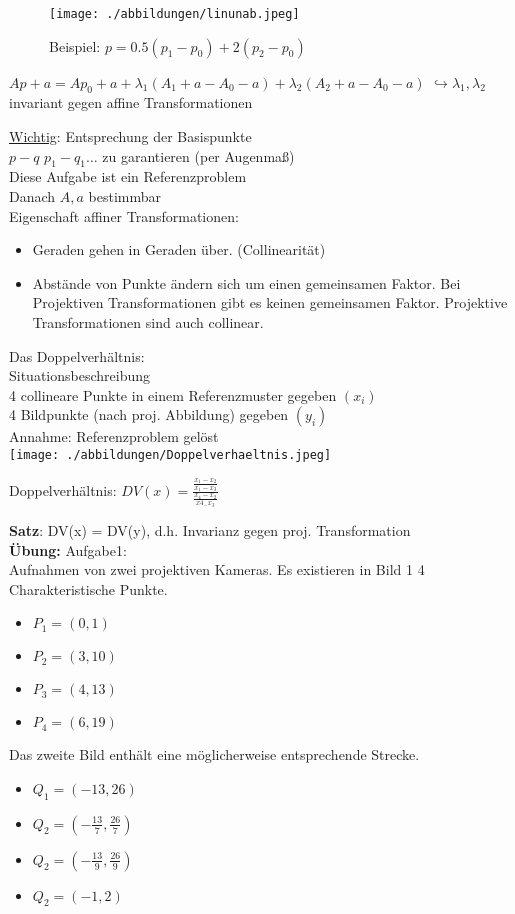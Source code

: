 \documentclass[a4paper,12pt]{scrreprt}
\begin{document}
\begin{figure}[h]
 \texttt{[image: ./abbildungen/linunab.jpeg]}
 \caption{Beispiel: $p=0.5(p_1-p_0)+2(p_2-p_0)$}
\end{figure}

$Ap+a = Ap_0 + a+ \lambda_1(A_1 + a - A_0 - a)+ \lambda_2(A_2 + a - A_0 - a)$
$\hookrightarrow \lambda_1 , \lambda_2$ invariant gegen affine Transformationen

\underline{Wichtig}: Entsprechung der Basispunkte\\
$p - q $ $ p_1 - q_1 \dots $
zu garantieren (per Augenmaß)\\
Diese Aufgabe ist ein Referenzproblem\\

Danach $A,a$ bestimmbar\\

Eigenschaft affiner Transformationen:\\
\begin{itemize}
 \item Geraden gehen in Geraden über. (Collinearität)
 \item Abstände von Punkte ändern sich um einen gemeinsamen Faktor. Bei Projektiven Transformationen gibt es keinen gemeinsamen Faktor. Projektive Transformationen sind auch collinear.
 
\end{itemize}

Das Doppelverhältnis:\\
Situationsbeschreibung\\
4 collineare Punkte in einem Referenzmuster gegeben $(x_i)$\\
4 Bildpunkte (nach proj. Abbildung) gegeben $(y_i)$\\
Annahme: Referenzproblem gelöst\\

\texttt{[image: ./abbildungen/Doppelverhaeltnis.jpeg]}

Doppelverhältnis:
$DV(x) = \frac{\frac{x_1 - x_2}{ x_1 - x_3}} {\frac{x_4 - x_2 }{x4_-x_3}} $

\textbf{Satz}: DV(x) = DV(y), d.h. Invarianz gegen proj. Transformation\\

\textbf{Übung:}
Aufgabe1:\\
Aufnahmen von zwei projektiven Kameras. Es existieren in Bild 1 4 Charakteristische Punkte.
 \begin{itemize}
  \item $P_1 = (0,1)$
  \item $P_2 = (3,10)$
  \item $P_3 = (4,13)$
  \item $P_4 = (6,19)$
 \end{itemize}
Das zweite Bild enthält eine möglicherweise entsprechende Strecke.
\begin{itemize}
 \item $Q_1=(-13,26)$
 \item $Q_2 = (-\frac{13}{7}, \frac{26}{7} ) $
 \item $Q_2 = (-\frac{13}{9}, \frac{26}{9} ) $
 \item $Q_2 = ( -1, 2 ) $
\end{itemize}
\end{document}
